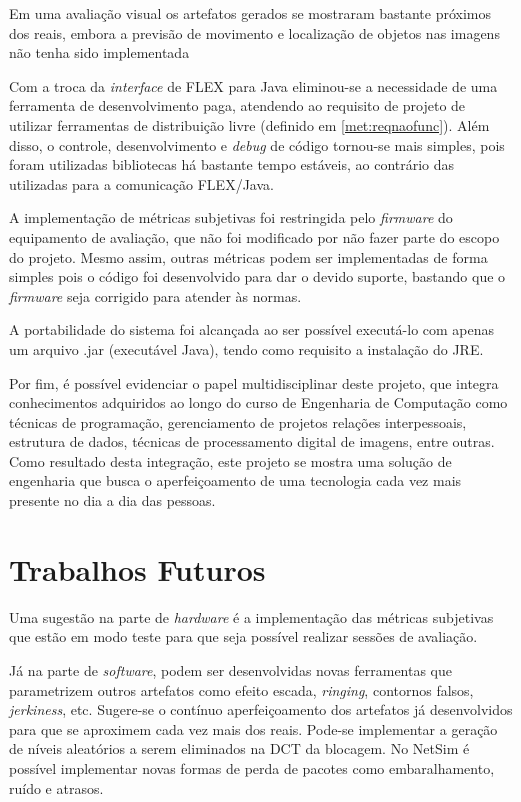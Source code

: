 Em uma avaliação visual os artefatos gerados se mostraram bastante próximos dos reais, embora a previsão de movimento e localização de objetos nas imagens não tenha sido implementada


Com a troca da \emph{interface} de FLEX para Java eliminou-se a necessidade de uma ferramenta de desenvolvimento paga, atendendo ao requisito de projeto de utilizar ferramentas de distribuição livre (definido em \ref{met:reqnaofunc}). Além disso, o controle, desenvolvimento e \emph{debug} de código tornou-se mais simples, pois foram utilizadas bibliotecas há bastante tempo estáveis, ao contrário das utilizadas para a comunicação FLEX/Java.

A implementação de métricas subjetivas foi restringida pelo \emph{firmware} do equipamento de avaliação, que não foi modificado por não fazer parte do escopo do projeto. Mesmo assim, outras métricas podem ser implementadas de forma simples pois o código foi desenvolvido para dar o devido suporte, bastando que o \emph{firmware} seja corrigido para atender às normas.

A portabilidade do sistema foi alcançada ao ser possível executá-lo com apenas um arquivo .jar (executável Java), tendo como requisito a instalação do JRE.

Por fim, é possível evidenciar o papel multidisciplinar deste projeto, que integra conhecimentos adquiridos ao longo do curso de Engenharia de Computação como técnicas de programação, gerenciamento de projetos relações interpessoais, estrutura de dados, técnicas de processamento digital de imagens, entre outras. Como resultado desta integração, este projeto se mostra uma solução de engenharia que busca o aperfeiçoamento de uma tecnologia cada vez mais presente no dia a dia das  pessoas.

\section{Trabalhos Futuros}

Uma sugestão na parte de \emph{hardware} é a implementação das métricas subjetivas que estão em modo teste para que seja possível realizar sessões de avaliação.

Já na parte de \emph{software}, podem ser desenvolvidas novas ferramentas que parametrizem outros artefatos como efeito escada, \emph{ringing}, contornos falsos, \emph{jerkiness}, etc. Sugere-se o contínuo aperfeiçoamento dos artefatos já desenvolvidos para que se aproximem cada vez mais dos reais. Pode-se implementar a geração de níveis aleatórios a serem eliminados na DCT da blocagem. No NetSim é possível implementar novas formas de perda de pacotes como embaralhamento, ruído e atrasos. 

